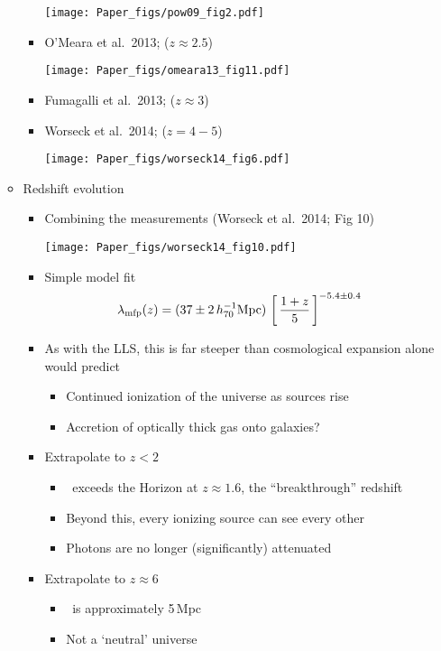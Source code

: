 \documentclass[12pt,letterpaper]{article}
\begin{document}
\begin{Aenumerate}
\begin{itemize}
\begin{itemize}
\begin{itemize}
\texttt{[image: Paper\_figs/pow09\_fig2.pdf]}

  		\item O'Meara et al.\ 2013; ($z \approx 2.5$)

\texttt{[image: Paper\_figs/omeara13\_fig11.pdf]}

  		\item Fumagalli et al.\ 2013; ($z \approx 3$)
  		\item Worseck et al.\ 2014; ($z = 4-5$)

\texttt{[image: Paper\_figs/worseck14\_fig6.pdf]}
  		\end{itemize}

  	\item Redshift evolution

  		\begin{itemize}
  		\item Combining the measurements (Worseck et al.\ 2014; Fig 10)

\texttt{[image: Paper\_figs/worseck14\_fig10.pdf]}

		\item Simple model fit
		\begin{equation}
		\lambda_{\rm mfp}(z) = (37 \pm 2 \, h_{70}^{-1} {\rm Mpc})
		\, \left [ \, \frac{1+z}{5} \, \right ]^{-5.4 \pm 0.4}
		\end{equation}

		\item As with the LLS, this is far steeper than cosmological
		expansion alone would predict
			\begin{itemize}
			\item Continued ionization of the universe as sources rise
			\item Accretion of optically thick gas onto galaxies?
			\end{itemize}

		\item Extrapolate to $z<2$
			\begin{itemize}
			\item \lmfp\ exceeds the Horizon at $z \approx 1.6$, the
			``breakthrough'' redshift
			\item Beyond this, every ionizing source can see every other
			\item Photons are no longer (significantly) attenuated
			\end{itemize}
		\item Extrapolate to $z \approx 6$
			\begin{itemize}
			\item \lmfp\ is approximately 5\,Mpc
			\item Not a `neutral' universe
			\end{itemize}


\end{itemize}
\end{itemize}
\end{itemize}
\end{Aenumerate}
\end{document}
